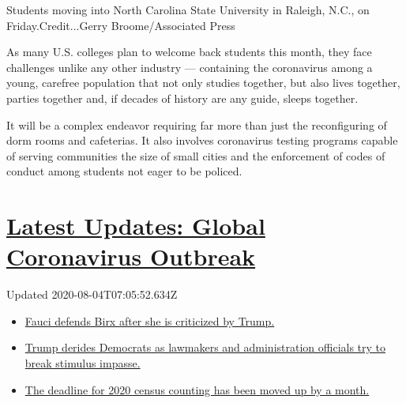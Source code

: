 Students moving into North Carolina State University in Raleigh, N.C.,
on Friday.Credit...Gerry Broome/Associated Press

As many U.S. colleges plan to welcome back students this month, they
face challenges unlike any other industry --- containing the coronavirus
among a young, carefree population that not only studies together, but
also lives together, parties together and, if decades of history are any
guide, sleeps together.

It will be a complex endeavor requiring far more than just the
reconfiguring of dorm rooms and cafeterias. It also involves coronavirus
testing programs capable of serving communities the size of small cities
and the enforcement of codes of conduct among students not eager to be
policed.

\hypertarget{latest-updates-global-coronavirus-outbreak}{%
\section{\texorpdfstring{\href{https://www.nytimes3xbfgragh.onion/2020/08/03/world/coronavirus-covid-19.html?action=click\&pgtype=Article\&state=default\&region=MAIN_CONTENT_1\&context=storylines_live_updates}{Latest
Updates: Global Coronavirus
Outbreak}}{Latest Updates: Global Coronavirus Outbreak}}\label{latest-updates-global-coronavirus-outbreak}}

Updated 2020-08-04T07:05:52.634Z

\begin{itemize}
\tightlist
\item
  \href{https://www.nytimes3xbfgragh.onion/2020/08/03/world/coronavirus-covid-19.html?action=click\&pgtype=Article\&state=default\&region=MAIN_CONTENT_1\&context=storylines_live_updates\#link-4547638f}{Fauci
  defends Birx after she is criticized by Trump.}
\item
  \href{https://www.nytimes3xbfgragh.onion/2020/08/03/world/coronavirus-covid-19.html?action=click\&pgtype=Article\&state=default\&region=MAIN_CONTENT_1\&context=storylines_live_updates\#link-15e7f995}{Trump
  derides Democrats as lawmakers and administration officials try to
  break stimulus impasse.}
\item
  \href{https://www.nytimes3xbfgragh.onion/2020/08/03/world/coronavirus-covid-19.html?action=click\&pgtype=Article\&state=default\&region=MAIN_CONTENT_1\&context=storylines_live_updates\#link-e5a2cda}{The
  deadline for 2020 census counting has been moved up by a month.}
\end{itemize}

